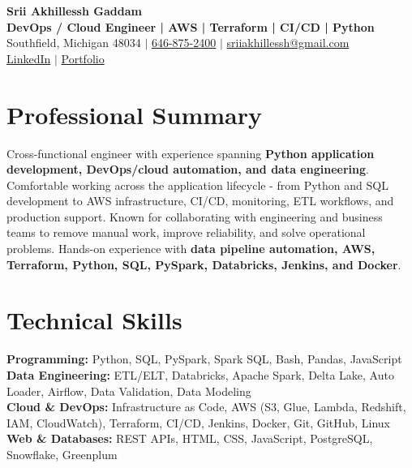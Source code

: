 \documentclass[letterpaper,10pt]{article}
\begin{document}
\fontsize{9.35pt}{10.45pt}\selectfont

\begin{center}
    {\LARGE \textbf{Srii Akhillessh Gaddam}} \\[-1pt]
    \textbf{DevOps / Cloud Engineer | AWS | Terraform | CI/CD | Python} \\[2pt]
    Southfield, Michigan 48034 $|$
    \href{tel:6468752400}{646-875-2400} $|$
    \href{mailto:sriiakhillessh@gmail.com}{sriiakhillessh@gmail.com} \\[1pt]
    \href{https://www.linkedin.com/in/srii-akhiilessh-gaddam-b48668191/}{LinkedIn} $|$
    \href{https://sriiakhillesshg.github.io/portfolio/}{Portfolio}
\end{center}
\vspace{-8pt}

\section{Professional Summary}
\small{Cross-functional engineer with experience spanning \textbf{Python application development, DevOps/cloud automation, and data engineering}. Comfortable working across the application lifecycle - from Python and SQL development to AWS infrastructure, CI/CD, monitoring, ETL workflows, and production support. Known for collaborating with engineering and business teams to remove manual work, improve reliability, and solve operational problems. Hands-on experience with \textbf{data pipeline automation, AWS, Terraform, Python, SQL, PySpark, Databricks, Jenkins, and Docker}.}

\section{Technical Skills}
\small{
\textbf{Programming:} Python, SQL, PySpark, Spark SQL, Bash, Pandas, JavaScript \\
\textbf{Data Engineering:} ETL/ELT, Databricks, Apache Spark, Delta Lake, Auto Loader, Airflow, Data Validation, Data Modeling \\
\textbf{Cloud \& DevOps:} Infrastructure as Code, AWS (S3, Glue, Lambda, Redshift, IAM, CloudWatch), Terraform, CI/CD, Jenkins, Docker, Git, GitHub, Linux \\
\textbf{Web \& Databases:} REST APIs, HTML, CSS, JavaScript, PostgreSQL, Snowflake, Greenplum
}
\end{document}
